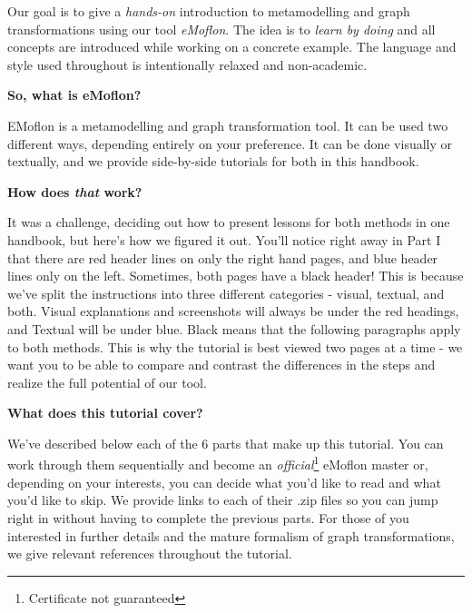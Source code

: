 Our goal is to give a \emph{hands-on} introduction to metamodelling and graph transformations using our tool \emph{eMoflon}. The idea is to \emph{learn by doing} and all concepts are introduced while working on a concrete example. The language and style used throughout is intentionally relaxed and non-academic.

{\bf \large So, what is eMoflon?}

EMoflon is a metamodelling and graph transformation tool. It can be used two different ways, depending entirely on your preference. It can be done visually or textually, and we provide side-by-side tutorials for both in this handbook.

{\bf \large How does \emph{that} work?}

It was a challenge, deciding out how to present lessons for both methods in one handbook, but here's how we figured it out. You'll notice right away in Part I that there are red header lines on only the right hand pages, and blue header lines only on the left. Sometimes, both pages have a black header! This is because we've split the instructions into three different categories - visual, textual, and both. Visual explanations and screenshots will always be under the red headings, and Textual will be under blue. Black means that the following paragraphs apply to both methods. This is why the tutorial is best viewed two pages at a time - we want you to be able to compare and contrast the differences in the steps and realize the full potential of our tool.

{\bf \large What does this tutorial cover?}

We've described below each of the 6 parts that make up this tutorial. You can work through them sequentially and become an \emph{official}\footnote{Certificate not guaranteed} eMoflon master or, depending on your interests, you can decide what you'd like to read and what you'd like to skip. We provide links to each of their .zip files so you can jump right in without having to complete the previous parts. For those of you interested in further details and the mature formalism of graph transformations, we give relevant references throughout the tutorial.

